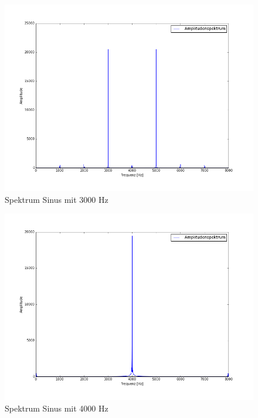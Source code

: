 \documentclass[12pt,oneside,a4paper]{report}
\begin{document}
\begin{figure}[H]
\centering\small
\includegraphics[scale=0.4]{src/3000fft.png}
\caption{Spektrum Sinus mit 3000 Hz}
\label{fig:3000_FFT}
\end{figure}

\begin{figure}[H]
\centering\small
\includegraphics[scale=0.4]{src/4000fft.png}
\caption{Spektrum Sinus mit 4000 Hz}
\label{fig:4000_FFT}
\end{figure}
\end{document}
